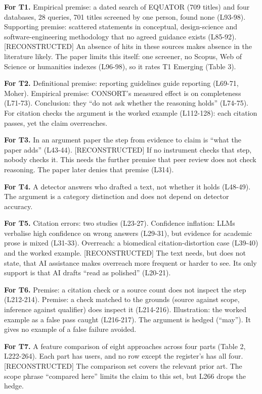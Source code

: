 {\textbf{For T1.} Empirical premise: a dated search of EQUATOR (709
titles) and four databases, 28 queries, 701 titles screened by one
person, found none (L93-98). Supporting premise: scattered statements in
conceptual, design-science and software-engineering methodology that no
agreed guidance exists (L85-92). {[}RECONSTRUCTED{]} An absence of hits
in these sources makes absence in the literature likely. The paper
limits this itself: one screener, no Scopus, Web of Science or
humanities indexes (L96-98), so it rates T1 Emerging (Table 3).

\textbf{For T2.} Definitional premise: reporting guidelines guide
reporting (L69-71, Moher). Empirical premise: CONSORT's measured effect
is on completeness (L71-73). Conclusion: they ``do not ask whether the
reasoning holds'' (L74-75). For citation checks the argument is the
worked example (L112-128): each citation passes, yet the claim
overreaches.

\textbf{For T3.} In an argument paper the step from evidence to claim is
``what the paper adds'' (L43-44). {[}RECONSTRUCTED{]} If no instrument
checks that step, nobody checks it. This needs the further premise that
peer review does not check reasoning. The paper later denies that
premise (L314).

\textbf{For T4.} A detector answers who drafted a text, not whether it
holds (L48-49). The argument is a category distinction and does not
depend on detector accuracy.

\textbf{For T5.} Citation errors: two studies (L23-27). Confidence
inflation: LLMs verbalise high confidence on wrong answers (L29-31), but
evidence for academic prose is mixed (L31-33). Overreach: a biomedical
citation-distortion case (L39-40) and the worked example.
{[}RECONSTRUCTED{]} The text needs, but does not state, that AI
assistance makes overreach more frequent or harder to see. Its only
support is that AI drafts ``read as polished'' (L20-21).

\textbf{For T6.} Premise: a citation check or a source count does not
inspect the step (L212-214). Premise: a check matched to the grounds
(source against scope, inference against qualifier) does inspect it
(L214-216). Illustration: the worked example as a false pass caught
(L216-217). The argument is hedged (``may''). It gives no example of a
false failure avoided.

\textbf{For T7.} A feature comparison of eight approaches across four
parts (Table 2, L222-264). Each part has users, and no row except the
register's has all four. {[}RECONSTRUCTED{]} The comparison set covers
the relevant prior art. The scope phrase ``compared here'' limits the
claim to this set, but L266 drops the hedge.

}
